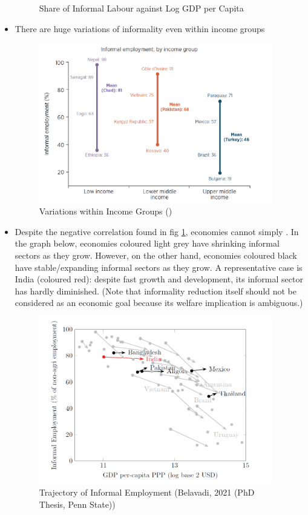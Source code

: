 \begin{itemize}
\begin{figure}[H]
                \caption{Share of Informal Labour against Log GDP per Capita}
                \label{fig:informality_gdp}
            \end{figure}
            \item There are huge variations of informality even within income groups
            \begin{figure}[H]
                \centering
                \includegraphics[width=4in]{images/ch5/variation within income groups.png}
                \caption{Variations within Income Groups (\cite{penny_goldberg_penny_2022})}
            \end{figure}
            \item Despite the negative correlation found in fig \ref{fig:informality_gdp}, economies cannot simply . In the graph below, economies coloured light grey have shrinking informal sectors as they grow. However, on the other hand, economies coloured black have stable/expanding informal sectors as they grow. A representative case is India (coloured red): despite fast growth and development, its informal sector has hardly diminished. (Note that informality reduction itself should not be considered as an economic goal because its welfare implication is ambiguous.)
            \begin{figure}[H]
                \centering
                \includegraphics[width=4in]{images/ch5/cant grow out of informality.png}
                \caption{Trajectory of Informal Employment (Belavadi, 2021 (PhD Thesis, Penn State))}
            \end{figure}
        \end{itemize}
        

